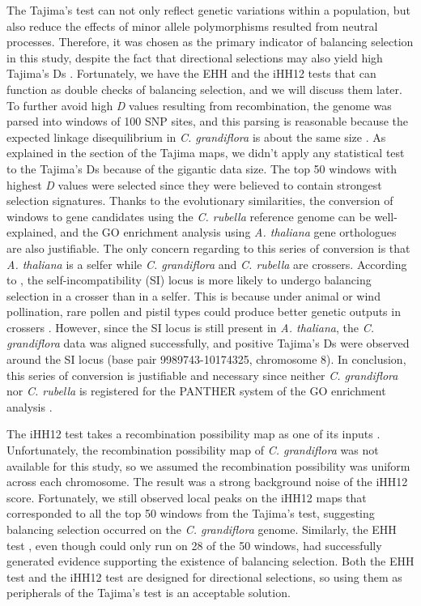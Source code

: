 The Tajima’s test can not only reflect genetic variations within a population, but also reduce the effects of minor allele polymorphisms resulted from neutral processes. Therefore, it was chosen as the primary indicator of balancing selection in this study, despite the fact that directional selections may also yield high Tajima’s Ds \citep{RN12}. Fortunately, we have the EHH and the iHH12 tests that can function as double checks of balancing selection, and we will discuss them later. To further avoid high \emph{D} values resulting from recombination, the genome was parsed into windows of 100 SNP sites, and this parsing is reasonable because the expected linkage disequilibrium in \emph{C. grandiflora} is about the same size \citep{RN11}. As explained in the section of the Tajima maps, we didn’t apply any statistical test to the Tajima’s Ds because of the gigantic data size. The top 50 windows with highest \emph{D} values were selected since they were believed to contain strongest selection signatures. Thanks to the evolutionary similarities, the conversion of windows to gene candidates using the \emph{C. rubella} reference genome can be well-explained, and the GO enrichment analysis using \emph{A. thaliana} gene orthologues are also justifiable. The only concern regarding to this series of conversion is that \emph{A. thaliana} is a selfer while \emph{C. grandiflora} and \emph{C. rubella} are crossers. According to \citet{RN1}, the self-incompatibility (SI) locus is more likely to undergo balancing selection in a crosser than in a selfer. This is because under animal or wind pollination, rare pollen and pistil types could produce better genetic outputs in crossers \citep{RN1}. However, since the SI locus is still present in \emph{A. thaliana}, the \emph{C. grandiflora} data was aligned successfully, and positive Tajima’s Ds were observed around the SI locus (base pair 9989743-10174325, chromosome 8). In conclusion, this series of conversion is justifiable and necessary since neither \emph{C. grandiflora} nor \emph{C. rubella} is registered for the PANTHER system of the GO enrichment analysis \citep{RN17}.

The iHH12 test takes a recombination possibility map as one of its inputs \citep{RN16}. Unfortunately, the recombination possibility map of \emph{C. grandiflora} was not available for this study, so we assumed the recombination possibility was uniform across each chromosome. The result was a strong background noise of the iHH12 score. Fortunately, we still observed local peaks on the iHH12 maps that corresponded to all the top 50 windows from the Tajima’s test, suggesting balancing selection occurred on the \emph{C. grandiflora} genome. Similarly, the EHH test \citep{RN14}, even though could only run on 28 of the 50 windows, had successfully generated evidence supporting the existence of balancing selection. Both the EHH test and the iHH12 test are designed for directional selections, so using them as peripherals of the Tajima’s test is an acceptable solution.

